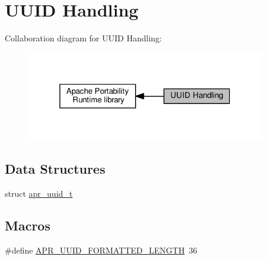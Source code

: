 \hypertarget{group__APR__UUID}{}\section{U\+U\+ID Handling}
\label{group__APR__UUID}
Collaboration diagram for U\+U\+ID Handling\+:
\nopagebreak
\begin{figure}[H]
\begin{center}
\leavevmode
\includegraphics[width=295pt]{group__APR__UUID}
\end{center}
\end{figure}
\subsection*{Data Structures}
\begin{DoxyCompactItemize}
\item 
struct \hyperlink{structapr__uuid__t}{apr\+\_\+uuid\+\_\+t}
\end{DoxyCompactItemize}
\subsection*{Macros}
\begin{DoxyCompactItemize}
\item 
\#define \hyperlink{group__APR__UUID_ga295b64f854c9dff02bb0c44e4be917a3}{A\+P\+R\+\_\+\+U\+U\+I\+D\+\_\+\+F\+O\+R\+M\+A\+T\+T\+E\+D\+\_\+\+L\+E\+N\+G\+TH}~36
\end{DoxyCompactItemize}
